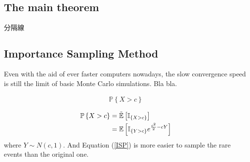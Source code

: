 \documentclass[12pt]{article}  %
\numberwithin{equation}{subsection}
\newtheorem{alg}{Algorithm}[section]  %
\theoremstyle{plain}
\begin{document}
\subsection{The main theorem}

分隔線








\subsection{Importance Sampling Method}
Even with the aid of ever faster computers nowadays, the slow convergence speed is still the limit of basic Monte Carlo simulations. Bla bla.

\begin{align}
\mathbb{P}\left\lbrace X>c\right\rbrace \label{MCP}
\end{align}

\begin{align}
\mathbb{P}\left\lbrace X>c\right\rbrace&=\mathbb{\tilde{E}}\left[ \mathbb{I}_{\left\lbrace X>c\right\rbrace }\right]  \notag\\
&=\mathbb{E}\left[ \mathbb{I}_{\left\lbrace Y>c\right\rbrace }e^{\frac{c^2}{2}-cY}\right] \label{ISP}
\end{align}
where $Y\sim N(c,1)$. And Equation (\ref{ISP}) is more easier to sample the rare events than the original one.
\end{document}
